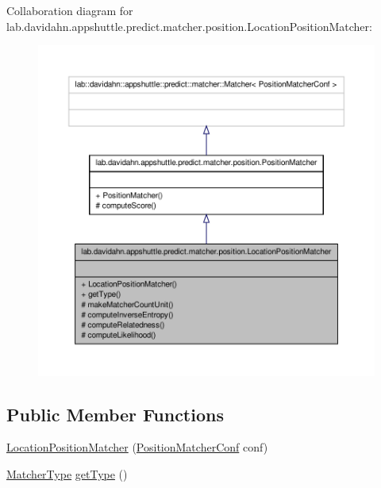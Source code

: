 \-Collaboration diagram for lab.\-davidahn.\-appshuttle.\-predict.\-matcher.\-position.\-Location\-Position\-Matcher\-:
\nopagebreak
\begin{figure}[H]
\begin{center}
\leavevmode
\includegraphics[width=350pt]{classlab_1_1davidahn_1_1appshuttle_1_1predict_1_1matcher_1_1position_1_1_location_position_matcher__coll__graph}
\end{center}
\end{figure}
\subsection*{\-Public \-Member \-Functions}
\begin{DoxyCompactItemize}
\item 
\hyperlink{classlab_1_1davidahn_1_1appshuttle_1_1predict_1_1matcher_1_1position_1_1_location_position_matcher_ab98d33b266c9e85f0c88a69bdc96cae4}{\-Location\-Position\-Matcher} (\hyperlink{classlab_1_1davidahn_1_1appshuttle_1_1predict_1_1matcher_1_1position_1_1_position_matcher_conf}{\-Position\-Matcher\-Conf} conf)
\item 
\hyperlink{enumlab_1_1davidahn_1_1appshuttle_1_1predict_1_1matcher_1_1_matcher_type}{\-Matcher\-Type} \hyperlink{classlab_1_1davidahn_1_1appshuttle_1_1predict_1_1matcher_1_1position_1_1_location_position_matcher_ace1434b47f9f9b06301cdd10fa29c001}{get\-Type} ()
\end{DoxyCompactItemize}
